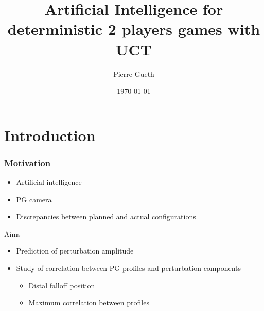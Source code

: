 \documentclass{beamer}
\title{Artificial Intelligence for deterministic 2 players games with UCT}
\author{Pierre Gueth}
\institute{}
\date{\today}
\begin{document}
\maketitle


\section{Introduction}

\begin{frame}
\frametitle{Motivation}
\begin{block}{}
\begin{itemize}
\item Artificial intelligence 
\item PG camera
\item Discrepancies between planned and actual configurations
\end{itemize}
\end{block}
\begin{block}{Aims}
\begin{itemize}
\item \alert{Prediction of perturbation amplitude}
\item Study of correlation between PG profiles and perturbation components
\begin{itemize}
\item Distal falloff position
\item Maximum correlation between profiles
\end{itemize}
\end{itemize}
\end{block}
\end{frame}
\end{document}
